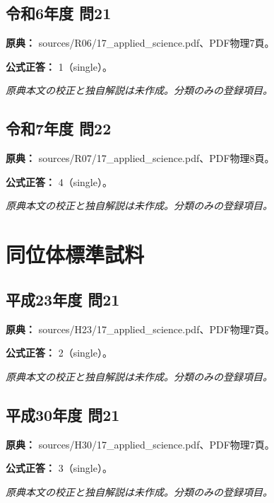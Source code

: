 \subsection{令和6年度 問21}
\label{q:r06-reg-applied-21}

\noindent\textbf{原典：} sources/R06/17\_applied\_science.pdf、PDF物理7頁。

\textbf{公式正答：} 1（single）。

\par\textit{原典本文の校正と独自解説は未作成。分類のみの登録項目。}

\subsection{令和7年度 問22}
\label{q:r07-reg-applied-22}

\noindent\textbf{原典：} sources/R07/17\_applied\_science.pdf、PDF物理8頁。

\textbf{公式正答：} 4（single）。

\par\textit{原典本文の校正と独自解説は未作成。分類のみの登録項目。}

\section{同位体標準試料}

\subsection{平成23年度 問21}
\label{q:h23-reg-applied-21}

\noindent\textbf{原典：} sources/H23/17\_applied\_science.pdf、PDF物理7頁。

\textbf{公式正答：} 2（single）。

\par\textit{原典本文の校正と独自解説は未作成。分類のみの登録項目。}

\subsection{平成30年度 問21}
\label{q:h30-reg-applied-21}

\noindent\textbf{原典：} sources/H30/17\_applied\_science.pdf、PDF物理7頁。

\textbf{公式正答：} 3（single）。

\par\textit{原典本文の校正と独自解説は未作成。分類のみの登録項目。}


